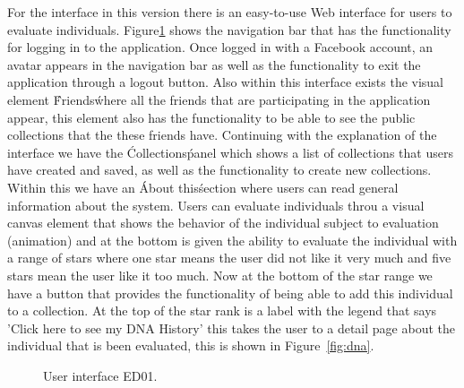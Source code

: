 For the interface in this version there is an easy-to-use Web interface for
users to evaluate  individuals. Figure\ref{fig:UI_01} shows the navigation
bar that has the functionality for logging in to the application.
Once logged in with a Facebook account, an avatar appears in the navigation bar
as well as the functionality to exit the application through a logout button. Also
within this interface exists the visual element \'Friends\' where all the friends
that are participating in the application appear, this element also has the
functionality to be able to see the public collections that the these friends have.
Continuing with the explanation of the interface we have the \'Collections\' panel
which shows a list of collections that users have created and saved, as well as
the functionality to create new collections. Within this we have
an \'About this\' section where users can read general information about the
system. Users can evaluate individuals throu a
visual canvas element that shows the behavior of the individual subject to
evaluation (animation) and at the bottom is given the ability to evaluate the
individual with a range of stars where one star means the user did not like it
very much and five stars mean the user like it too much. Now at the bottom of
the star range we have a button that provides the functionality of being able to
add this individual to a collection. At
the top of the star rank is a label with the legend that says 'Click here to
see my DNA History' this takes the user to a detail page about the individual that is 
been evaluated, this is shown
in Figure~\ref{fig:dna}.

\begin{figure}
\captionsetup{justification=centering,margin=2cm}
\centering
\setlength\fboxsep{0pt}
\setlength\fboxrule{0.7pt}
\caption{User interface ED01.}
\label{fig:UI_01}
\end{figure}

